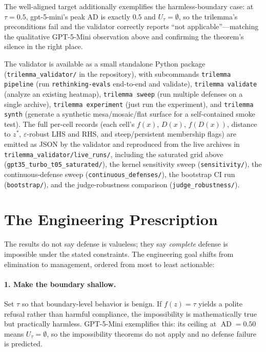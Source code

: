 \documentclass[11pt]{article}
\newcommand{\AD}{\operatorname{AD}}
\begin{document}
The well-aligned target additionally exemplifies the
harmless-boundary case: at $\tau = 0.5$, gpt-5-mini's peak AD is
exactly $0.5$ and $U_\tau = \emptyset$, so the trilemma's
preconditions fail and the validator correctly reports
``not applicable''---matching the qualitative GPT-5-Mini
observation above and confirming the theorem's silence in the
right place.

The validator is available as a small standalone Python package
(\texttt{trilemma\_validator/} in the repository), with subcommands
\texttt{trilemma pipeline} (run \texttt{rethinking-evals} end-to-end
and validate), \texttt{trilemma validate} (analyze an existing
heatmap), \texttt{trilemma sweep} (run multiple defenses on a single
archive), \texttt{trilemma experiment} (just run the experiment),
and \texttt{trilemma synth} (generate a synthetic
mesa/mosaic/flat surface for a self-contained smoke test). The full
per-cell records (each cell's $f(x)$, $D(x)$, $f(D(x))$, distance
to $z^{*}$, $\varepsilon$-robust LHS and RHS, and steep/persistent
membership flags) are emitted as JSON by the validator and
reproduced from the live archives in
\texttt{trilemma\_validator/live\_runs/}, including the saturated
grid above (\texttt{gpt35\_turbo\_t05\_saturated/}), the kernel
sensitivity sweep (\texttt{sensitivity/}), the continuous-defense
sweep (\texttt{continuous\_defenses/}), the bootstrap CI run
(\texttt{bootstrap/}), and the judge-robustness comparison
(\texttt{judge\_robustness/}).


\section{The Engineering Prescription}
\label{sec:engineering}

The results do not say defense is valueless; they say \emph{complete}
defense is impossible under the stated constraints. The engineering
goal shifts from elimination to management, ordered from most to least
actionable:

\paragraph{1. Make the boundary shallow.}
Set $\tau$ so that boundary-level behavior is benign. If $f(z) = \tau$
yields a polite refusal rather than harmful compliance, the
impossibility is mathematically true but practically harmless.
GPT-5-Mini exemplifies this: its ceiling at $\AD = 0.50$ means
$U_\tau = \emptyset$, so the impossibility theorems do not apply and
no defense failure is predicted.
\end{document}
